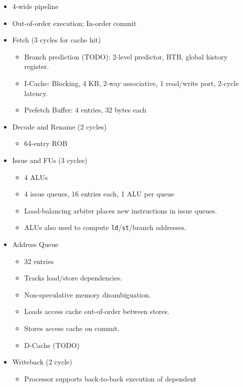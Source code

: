 \documentclass{article}
\begin{document}
\begin{itemize}
    \item 4-wide pipeline
    \item Out-of-order execution; In-order commit
    \item Fetch (3 cycles for cache hit)
        \begin{itemize}
            \item Branch prediction (TODO): 2-level predictor, BTB, global
                history register.
            \item I-Cache: Blocking, 4 KB, 2-way associative, 1 read/write
                port, 2-cycle latency.
            \item Prefetch Buffer: 4 entries, 32 bytes each
        \end{itemize}
    \item Decode and Rename (2 cycles)
        \begin{itemize}
            \item 64-entry ROB
        \end{itemize}
    \item Issue and FUs (3 cycles)
        \begin{itemize}
            \item 4 ALUs
            \item 4 issue queues, 16 entries each, 1 ALU per queue
            \item Load-balancing arbiter places new instructions in issue
                queues.
            \item ALUs also used to compute \texttt{ld}/\texttt{st}/branch
                addresses.
        \end{itemize}
    \item Address Queue
        \begin{itemize}
            \item 32 entries
            \item Tracks load/store dependencies.
            \item Non-speculative memory disambiguation.
            \item Loads access cache out-of-order between stores.
            \item Stores access cache on commit.
            \item D-Cache (TODO)
        \end{itemize}
    \item Writeback (2 cycle)
        \begin{itemize}
            \item Processor supports back-to-back execution of dependent

\end{itemize}
\end{itemize}
\end{document}
